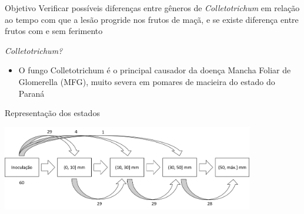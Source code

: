\begin{frame}

\pause

\begin{block}{Objetivo}
 Verificar possíveis diferenças entre gêneros de \textit{Colletotrichum}
 em relação ao tempo com que a lesão progride nos frutos de maçã, e se
 existe diferença entre frutos com e sem ferimento
\end{block}

\vspace{.5cm}

\pause \textit{Colletotrichum?}

\vspace{.5cm}

\pause

\begin{itemize}
 \item O fungo Colletotrichum é o principal causador da doença Mancha
       Foliar de Glomerella (MFG), muito severa em pomares de macieira
       do estado do Paraná
\end{itemize}

\end{frame}

\begin{frame}

Representação dos estados

\vspace{.3cm}\begin{center}
 \includegraphics*[width = 11cm]{ic.png}
\end{center}

\end{frame}

